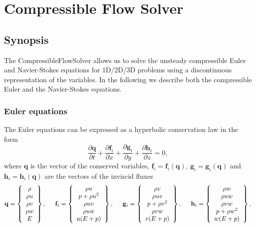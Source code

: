 \chapter{Compressible Flow Solver}

\section{Synopsis}
The CompressibleFlowSolver allows us to solve
the unsteady compressible Euler and Navier-Stokes
equations for 1D/2D/3D problems using a discontinuous
representation of the variables. In the following we describe
both the compressible Euler and the Navier-Stokes equations.

\subsection{Euler equations}
The Euler equations can be expressed as a hyperbolic
conservation law in the form
\begin{equation}\label{eq:euler}
\frac{\partial \mathbf{q} }{\partial t} + \frac{\partial \mathbf{f}_i}{\partial x}
+ \frac{\partial \mathbf{g}_i}{\partial y} +
\frac{\partial \mathbf{h}_i}{\partial z} = 0,
\end{equation}
where $\mathbf{q} $ is the vector of the conserved variables,
$\mathbf{f}_i =  \mathbf{f}_i (\mathbf{q})$, $\mathbf{g}_i
= \mathbf{g}_i (\mathbf{q})$ and $\mathbf{h}_i =
\mathbf{h}_i (\mathbf{q})$ are  the vectors of the
inviscid fluxes
\begin{equation}
\mathbf{q} =\left\{
\begin{array}{c}
\rho \\
\rho u \\
\rho v \\
\rho w \\
E
\end{array} \right\}, \hspace{0.5 cm}
\mathbf{f}_i =\left\{
\begin{array}{c}
\rho u \\
p + \rho u^2 \\
\rho u v \\
\rho u w \\
u (E + p)
\end{array} \right\}, \hspace{0.5 cm}
\mathbf{g}_i =\left\{
\begin{array}{c}
\rho v \\
\rho u v \\
p + \rho v^2 \\
\rho v w \\
v (E + p)
\end{array} \right\}, \hspace{0.5 cm}
\mathbf{h}_i =\left\{
\begin{array}{c}
\rho w \\
\rho u w \\
\rho v w \\
p + \rho w^2 \\
w (E + p)
\end{array} \right\},
\label{Euler}
\end{equation}
